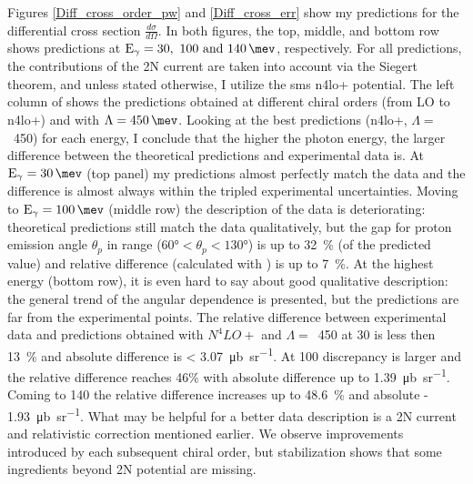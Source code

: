         
    Figures \ref{Diff_cross_order_pw} and \ref{Diff_cross_err} show my predictions 
    for the differential cross section
    $\frac{d\sigma}{d\Omega}$.
    In both figures, the top, middle, and bottom row shows predictions at 
    $\text{E}_\gamma = \SIlist[list-units = single]{30;100;140}{\mev}$, respectively.
    For all predictions, the contributions of the 2N current are taken into account via the Siegert theorem,
    and unless stated otherwise, I utilize the \gls{sms} \gls{n4lo+} potential.
    The left column of  shows the predictions obtained at 
    different chiral orders (from LO to \gls{n4lo+}) and with $\Lambda=\SI{450}{\mev}$.
    Looking at the best predictions (\gls{n4lo+}, $\Lambda=$~\SI{450}{\mev}) for each
    energy, I
    conclude that the higher the photon energy, the larger 
    difference between the theoretical predictions and experimental 
    data is. At $\text{E}_\gamma = \SI{30}{\mev}$ (top panel) my predictions
    almost perfectly match the data and the difference is almost always
    within the tripled experimental uncertainties. 
    Moving to  $\text{E}_\gamma=\SI{100}{\mev}$ (middle row)
    the description of the data is deteriorating: theoretical
    predictions still match the data qualitatively, but
    the gap for proton emission angle $\theta_p$ in range ($\ang{60} < \theta_p < \ang{130}$) 
    is up to \SI{32}{\percent} (of the predicted value)
    and relative difference (calculated with ) is up to
    \SI{7}{\percent}.
    At the highest energy (bottom row), it is even hard to say about 
    good qualitative description: the general trend of the
    angular dependence is presented, but the predictions are 
    far from the experimental points.
    The relative difference between experimental data and predictions obtained with $N^4LO+$ and $\Lambda=$~\SI{450}{\mev} at \SI{30}{\mev} is less then \SI{13}{\percent}
    and absolute difference is < \SI{3.07}{\micro \barn \per \steradian}.
    At \SI{100}{\mev} discrepancy is larger and the relative difference reaches 46\% with absolute difference up to \SI{1.39}{\micro \barn \per \steradian}.
    Coming to \SI{140}{\mev} the relative difference 
    increases up to \SI{48.6}{\percent} and absolute - \SI{1.93}{\micro \barn \per \steradian}.
    What may be helpful
    for a better data description is a 2N current 
    and relativistic correction mentioned earlier.
    We observe improvements introduced by each subsequent chiral order, but 
    stabilization shows that some ingredients beyond 2N potential are missing.


